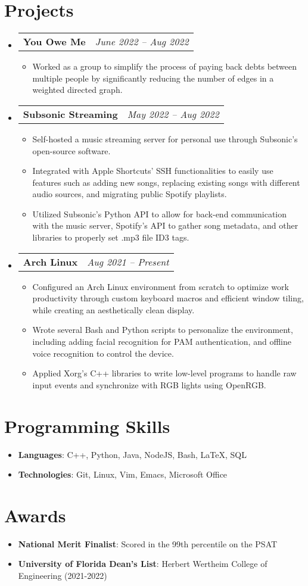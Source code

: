 \documentclass[letterpaper,11pt]{article}
\makeatletter
\newcommand{\resumeItemSkills}[2]{
  \item\normalsize{
    \textbf{#1}{: #2 \vspace{-2pt}}
  }
}
\newcommand{\resumeItemExperience}[1]{
  \item\small{
    {#1 \vspace{-2pt}}
  }
}
\newcommand{\resumeSubheadingProject}[2]{
  \vspace{-1pt}\item
    \begin{tabular*}{0.97\textwidth}{l@{\extracolsep{\fill}}r}
      \textbf{#1} & \textit{\small #2} \\
    \end{tabular*}\vspace{-5pt}
}
\newcommand{\resumeSubItemSkills}[2]{\resumeItemSkills{#1}{#2}\vspace{-4pt}}
\newcommand{\resumeSubHeadingListStart}{\begin{itemize}[leftmargin=*, label={}]}
\newcommand{\resumeSubHeadingListStartSkillsAwards}{\begin{itemize}[leftmargin=*]}
\newcommand{\resumeSubHeadingListEnd}{\end{itemize}}
\newcommand{\resumeItemListStart}{\begin{itemize}}
\newcommand{\resumeItemListEnd}{\end{itemize}\vspace{-5pt}}
\makeatother
\begin{document}
\section{Projects}
  \resumeSubHeadingListStart
        \resumeSubheadingProject
          {You Owe Me}{June 2022 -- Aug 2022}
          \resumeItemListStart
            \resumeItemExperience
              {Worked as a group to simplify the process of paying back debts between multiple people by significantly reducing the number of edges in a weighted directed graph.}
          \resumeItemListEnd
        \resumeSubheadingProject
          {Subsonic Streaming}{May 2022 -- Aug 2022}
          \resumeItemListStart
            \resumeItemExperience
              {Self-hosted a music streaming server for personal use through Subsonic's open-source software.}
            \resumeItemExperience
              {Integrated with Apple Shortcuts' SSH functionalities to easily use features such as adding new songs, replacing existing songs with different audio sources, and migrating public Spotify playlists.}
            \resumeItemExperience
              {Utilized Subsonic's Python API to allow for back-end communication with the music server, Spotify's API to gather song metadata, and other libraries to properly set .mp3 file ID3 tags.}
          \resumeItemListEnd
        \resumeSubheadingProject
          {Arch Linux}{Aug 2021 -- Present}
          \resumeItemListStart
            \resumeItemExperience
              {Configured an Arch Linux environment from scratch to optimize work productivity through custom keyboard macros and efficient window tiling, while creating an aesthetically clean display.}
            \resumeItemExperience
              {Wrote several Bash and Python scripts to personalize the environment, including adding facial recognition for PAM authentication, and offline voice recognition to control the device.}
            \resumeItemExperience
              {Applied Xorg's C++ libraries to write low-level programs to handle raw input events and synchronize with RGB lights using OpenRGB.}
          \resumeItemListEnd
    \resumeSubHeadingListEnd
          
\section{Programming Skills}
 \resumeSubHeadingListStartSkillsAwards
   \resumeSubItemSkills{Languages}{C++, Python, Java, NodeJS, Bash, LaTeX, SQL}
    \resumeSubItemSkills{Technologies}{Git, Linux, Vim, Emacs, Microsoft Office}
 \resumeSubHeadingListEnd

\section{Awards}
  \resumeSubHeadingListStartSkillsAwards
    \resumeSubItemSkills{National Merit Finalist}
      {Scored in the 99th percentile on the PSAT}
    \resumeSubItemSkills{University of Florida Dean's List}
      {Herbert Wertheim College of Engineering (2021-2022)}
  \resumeSubHeadingListEnd
\end{document}
